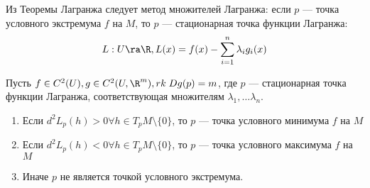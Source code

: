 
\begin{note}
    Из Теоремы Лагранжа следует метод множителей Лагранжа: если \(p\) --- точка условного экстремума \(f\) на \(M\), то \(p\) --- стационарная точка функции Лагранжа:
    \[L: U \ra \R, L(x) = f(x) - \sum_{i = 1}^n \lambda_i g_i(x)\]
\end{note}

\begin{theorem}
    Пусть \(f \in C^2(U), g \in C^2(U, \R^m), rk\;Dg(p) = m\), где \(p\) --- стационарная точка функции Лагранжа, соответствующая множителям \(\lambda_1, \dots \lambda_n\).
    \begin{enumerate}
        \item Если \(d^2L_p(h) > 0 \forall h \in T_pM \setminus \{0\}\), то \(p\) --- точка условного минимума \(f\) на \(M\)
        \item Если \(d^2L_p(h) < 0 \forall h \in T_pM \setminus \{0\}\), то \(p\) --- точка условного максимума \(f\) на \(M\)
        \item Иначе \(p\) не является точкой условного экстремума.
    \end{enumerate}
\end{theorem}
